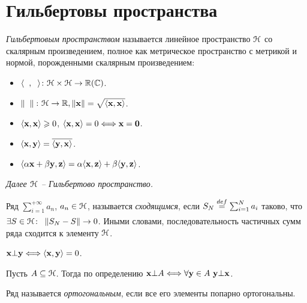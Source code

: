 \section{Гильбертовы пространства}

\begin{definition}
    \textit{Гильбертовым пространством} называется линейное пространство $\mathcal{H}$ со скалярным произведением,
    полное как метрическое пространство с метрикой и нормой, порожденными скалярным произведением:
    \begin{itemize}
        \item $\langle \phantom{x}, \phantom{x} \rangle \colon \mathcal{H} \times \mathcal{H} \to \mathbb{R}(\mathbb{C})$.
        \item $\left\lVert\phantom{x}\right\rVert \colon \mathcal{H} \to \mathbb{R}, \left\lVert\mathbf{x}\right\rVert = \sqrt{\langle \mathbf{x}, \mathbf{x} \rangle}$.
        \item $\langle \mathbf{x}, \mathbf{x} \rangle \geqslant 0$, $\langle \mathbf{x}, \mathbf{x} \rangle = 0 \Longleftrightarrow \mathbf{x} = \mathbf{0}$.
        \item $\langle \mathbf{x}, \mathbf{y} \rangle = \overline{\langle \mathbf{y}, \mathbf{x} \rangle}$.
        \item $\langle \alpha \mathbf{x} + \beta \mathbf{y}, \mathbf{z} \rangle = \alpha \langle \mathbf{x}, \mathbf{z} \rangle + \beta \langle \mathbf{y}, \mathbf{z} \rangle$.
    \end{itemize} 
\end{definition}


\textit{Далее $\mathcal{H}$ -- Гильбертово пространство.}

\begin{definition}
    Ряд $\sum_{i = 1}^{+\infty}{a_n}$, $a_n \in \mathcal{H}$, называется \textit{сходящимся}, если
    $S_N \overset{def}{\underset{}{=}} \sum_{i = 1}^{N}{a_i}$ таково, что $\exists S \in \mathcal{H} \colon~
    \left\lVert S_N - S\right\rVert \to 0$. Иными словами, последовательность частичных сумм ряда сходится 
    к элементу $\mathcal{H}$.
\end{definition}

\begin{definition}
    $\mathbf{x} \bot \mathbf{y} \Longleftrightarrow \langle \mathbf{x}, \mathbf{y} \rangle = 0$.
\end{definition}

\begin{definition}
    Пусть $A \subseteq \mathcal{H}$. Тогда по определению $\mathbf{x} \bot A \Longleftrightarrow \forall \mathbf{y} \in A~ \mathbf{y} \bot \mathbf{x}$.
\end{definition}

\begin{definition}
    Ряд называется \textit{ортогональным}, если все его элементы попарно ортогональны.
\end{definition}

